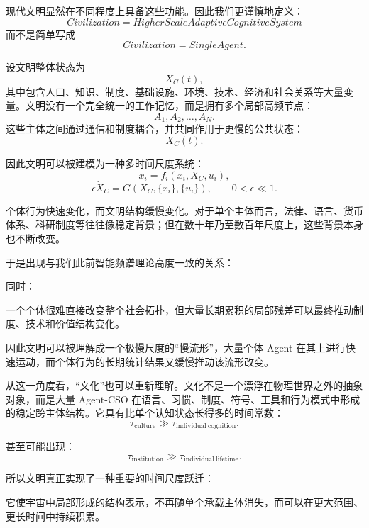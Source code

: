 现代文明显然在不同程度上具备这些功能。因此我们更谨慎地定义：
\[
\boxed{
Civilization
=
HigherScaleAdaptiveCognitiveSystem
}
\]
而不是简单写成
\[
Civilization=SingleAgent.
\]

设文明整体状态为
\[
X_C(t),
\]
其中包含人口、知识、制度、基础设施、环境、技术、经济和社会关系等大量变量。文明没有一个完全统一的工作记忆，而是拥有多个局部高频节点：
\[
A_1,A_2,\ldots,A_N.
\]
这些主体之间通过通信和制度耦合，并共同作用于更慢的公共状态：
\[
X_C(t).
\]

因此文明可以被建模为一种多时间尺度系统：
\[
\dot{x}_i
=
f_i(
x_i,
X_C,
u_i
),
\]
\[
\epsilon\dot{X}_C
=
G(
X_C,
\{x_i\},
\{u_i\}
),
\qquad
0<\epsilon\ll1.
\]

个体行为快速变化，而文明结构缓慢变化。对于单个主体而言，法律、语言、货币体系、科研制度等往往像稳定背景；但在数十年乃至数百年尺度上，这些背景本身也不断改变。

于是出现与我们此前智能频谱理论高度一致的关系：
\begin{statementbox}
\centering
{}
\end{statementbox}
同时：
\begin{statementbox}
\centering
{}
\end{statementbox}

一个个体很难直接改变整个社会拓扑，但大量长期累积的局部残差可以最终推动制度、技术和价值结构变化。

因此文明可以被理解成一个极慢尺度的“慢流形”，大量个体 Agent 在其上进行快速运动，而个体行为的长期统计结果又缓慢推动该流形改变。

从这一角度看，“文化”也可以重新理解。文化不是一个漂浮在物理世界之外的抽象对象，而是大量 Agent-CSO 在语言、习惯、制度、符号、工具和行为模式中形成的稳定跨主体结构。它具有比单个认知状态长得多的时间常数：
\[
\tau_{\mathrm{culture}}
\gg
\tau_{\mathrm{individual\ cognition}}.
\]

甚至可能出现：
\[
\tau_{\mathrm{institution}}
\gg
\tau_{\mathrm{individual\ lifetime}}.
\]

所以文明真正实现了一种重要的时间尺度跃迁：
\begin{statementbox}
\centering
{}
\end{statementbox}

它使宇宙中局部形成的结构表示，不再随单个承载主体消失，而可以在更大范围、更长时间中持续积累。

